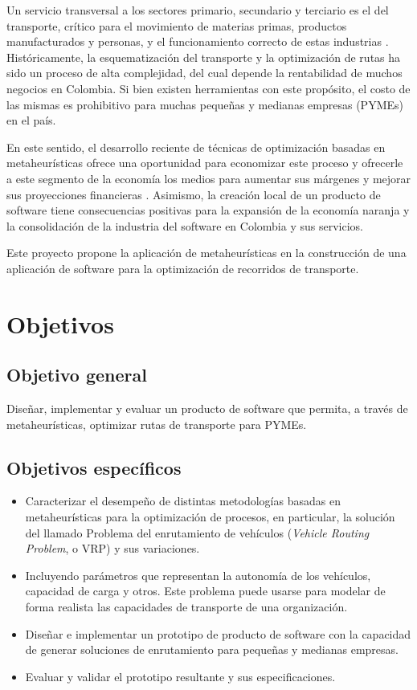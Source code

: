 \message{ !name(proposal.tex)}\documentclass[12pt]{extarticle}
\begin{document}
Un servicio transversal a los sectores primario, secundario y terciario es el
del transporte, crítico para el movimiento de materias primas, productos
manufacturados y personas, y el funcionamiento correcto de estas industrias
\cite{r_situacion_2010}. Históricamente, la esquematización del transporte y
la optimización de rutas ha sido un proceso de alta complejidad, del cual
depende la rentabilidad de muchos negocios en Colombia. Si bien existen
herramientas con este propósito, el costo de las mismas es prohibitivo para
muchas pequeñas y medianas empresas (PYMEs) en el país.

En este sentido, el desarrollo reciente de técnicas de optimización basadas en
metaheurísticas ofrece una oportunidad para economizar este proceso y ofrecerle
a este segmento de la economía los medios para aumentar sus márgenes y mejorar
sus proyecciones financieras \cite{gomez_metaheuristicas_2014}. Asimismo, la
creación local de un producto de software tiene consecuencias positivas para la
expansión de la economía naranja y la consolidación de la industria del software
en Colombia y sus servicios.

Este proyecto propone la aplicación de metaheurísticas en la construcción de una
aplicación de software para la optimización de recorridos de transporte.

\section{Objetivos}

\subsection{Objetivo general}
Diseñar, implementar y evaluar un producto de software que permita, a través de
metaheurísticas, optimizar rutas de transporte para PYMEs.

\subsection{Objetivos específicos}
\begin{itemize}
\item Caracterizar el desempeño de distintas metodologías basadas en
  metaheurísticas para la optimización de procesos, en particular, la solución
  del llamado Problema del enrutamiento de vehículos (\textit{Vehicle Routing
  Problem}, o VRP) y sus variaciones.
\item Incluyendo parámetros que representan la
  autonomía de los vehículos, capacidad de carga y otros. Este problema puede
  usarse para modelar de forma realista las capacidades de transporte de una
  organización.
\item Diseñar e implementar un prototipo de producto de software con la
  capacidad de generar soluciones de enrutamiento para pequeñas y medianas
  empresas.
\item Evaluar y validar el prototipo resultante y sus especificaciones.
\end{itemize}

\printbibliography
\end{document}
